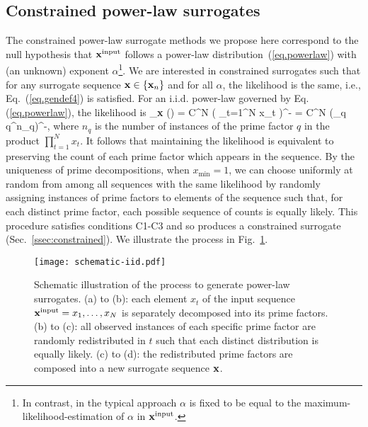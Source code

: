 \documentclass[%
prx,
reprint,
superscriptaddress,
nofootinbib,
 amsmath,amssymb,
 aps,
floatfix,
]{revtex4-2}
\let\oldequation\equation
\let\oldendequation\endequation
\renewenvironment{equation}{%
    \linenomathNonumbers\oldequation
    }{%
    \oldendequation\endlinenomath%
    }
\newcommand{\xin}{{{\bf x}^{\text{input}}}}
\begin{document}
\subsection{Constrained power-law surrogates}


The constrained power-law surrogate methods we propose here correspond to the null hypothesis that $\xin$ follows a power-law distribution~(\ref{eq.powerlaw}) with (an unknown) exponent $\alpha$\footnote{In contrast, in the typical approach $\alpha$ is fixed to be equal to the maximum-likelihood-estimation of $\alpha$ in $\xin$.}. 
We are interested in constrained surrogates such that for any surrogate sequence ${\bf x} \in \{{\bf x}_n\}$ and for all $\alpha$, the likelihood is the same, i.e., Eq.~(\ref{eq.gendef4}) is satisfied.
For an i.i.d. power-law governed by Eq. (\ref{eq.powerlaw}), the likelihood is
\begin{equation}\notag\label{eq.likelihood}
    _{{\bf x}} (\alpha) =  C^{N} \left( \prod\limits_{t=1}^N x_t \right)^{-\alpha}  = C^{N} \left(\prod\limits_{q} q^{n_q}\right)^{-\alpha},
\end{equation}
%
where $n_q$ is the number of instances of the prime factor $q$ in the product $\prod\limits_{t=1}^N x_t$. It follows that maintaining the likelihood is equivalent to preserving the count of each prime factor which appears in the sequence. By the uniqueness of prime decompositions, when $x_{\min} = 1$, we can choose uniformly at random from among all sequences with the same likelihood by randomly assigning instances of prime factors to elements of the sequence such that, for each distinct prime factor, each possible sequence of counts is equally likely. This procedure satisfies conditions C1-C3 and so produces a constrained surrogate (Sec.~\ref{ssec:constrained}). We illustrate the process in Fig.~\ref{fig:schematic-iid}.

\begin{figure}[htbp]
\texttt{[image: schematic-iid.pdf]}
\caption{Schematic illustration of the process to generate power-law surrogates. (a) to (b): each element $x_t$ of the input sequence $\xin = x_1, \ldots, x_N$ is separately decomposed into its prime factors. (b) to (c): all observed instances of each specific prime factor are randomly redistributed in $t$ {such that each distinct distribution is equally likely}. (c) to (d): the redistributed prime factors are composed into a new surrogate sequence ${\bf x}$. 
}
\label{fig:schematic-iid}
\end{figure}
\end{document}
